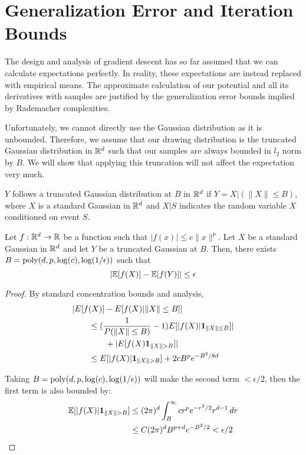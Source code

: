 
\section{Generalization Error and Iteration Bounds}
\label{finite}
 
The design and analysis of gradient descent has so far assumed that we can calculate expectations perfectly. In reality, these expectations are instead replaced with empirical means. The approximate calculation of our potential and all its derivatives with samples are justified by the generalization error bounds implied by Rademacher complexities. 

Unfortunately, we cannot directly use the Gaussian distribution as it is unbounded. Therefore, we assume that our drawing distribution is the truncated Gaussian distribution in ${\mathbb{R}}^d$ such that our samples are always bounded in $l_2$ norm by $B$. We will show that applying this truncation will not affect the expectation very much. 

\begin{definition}
$Y$ follows a truncated Gaussian distribution at $B$ in ${\mathbb{R}}^d$ if $Y = X | ( \|X\| \leq B)$, where $X$ is a standard Gaussian in ${\mathbb{R}}^d$ and $ X \Big|S$ indicates the random variable $X$ conditioned on event $S$.
\end{definition}
%
\begin{lemma}
\label{choppedLem}
Let $f : {\mathbb{R}}^d \to {\mathbb{R}}$ be a function such that $|f(x)| \leq c\|x\|^p$. Let $X$ be a standard Gaussian in ${\mathbb{R}}^d$ and let $Y$ be a truncated Gaussian at $B$. Then, there exists $B = \mathrm{poly}(d,p,\log(c), \log(1/\epsilon))$ such that 
\[ \left|\operatorname*{\mathbb{E}}[f(X)] - \operatorname*{\mathbb{E}}[f(Y)] \right| \leq \epsilon\]
\end{lemma}

\begin{proof}
By standard concentration bounds and analysis, 
\begin{align*}
& |E[f(X)] - E[f(X)| \|X\|\leq B]| \\
& \qquad \leq (\frac{1}{P(\|X\|\leq B)}- 1) E[|f(X)|{\bf 1}_{\|X\|\leq B}]| \\
& \qquad \qquad + |E[f(X){\bf 1}_{\|X\|>B}]| \\
& \qquad \leq E[|f(X)|{\bf 1}_{\|X\|>B}] + 2cB^pe^{-B^2/8d}
\end{align*}


Taking $B = \mathrm{poly}(d,p,\log(c), \log(1/\epsilon))$ will make the second term $< \epsilon/2$, then the first term is also bounded by:
\begin{align*}
  \expt[|f(X)|{\bf 1}_{\|X\|>B}] & \leq (2\pi)^d \int_B^\infty cr^pe^{-r^2/2}r^{d-1}\,dr \\
                                  &\leq C(2\pi)^dB^{p+d}e^{-B^2/2} < \epsilon/2
\end{align*}
\end{proof}

